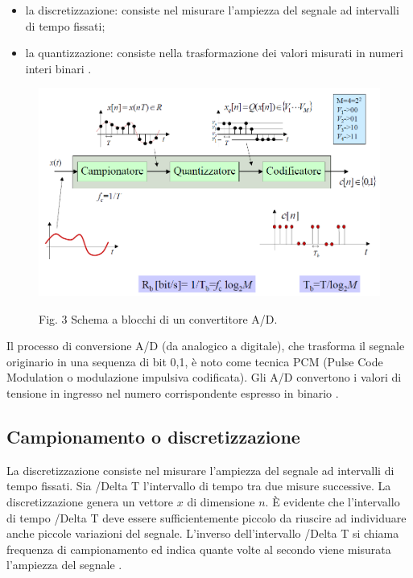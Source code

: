 \documentclass[a4paper]{report} %
\begin{document}
\begin{itemize}
\item la discretizzazione: consiste nel misurare l'ampiezza del segnale ad intervalli di tempo fissati;
\item la quantizzazione: consiste nella trasformazione dei valori misurati in numeri interi binari \cite{art:rif.2}. 
\end{itemize} 

\begin{figure}
	\centering
	\includegraphics[scale=.4]{Immagini/schemaAD.png}
	
	Fig. 3 Schema a blocchi di un convertitore A/D.
\end{figure}

Il processo di conversione A/D (da analogico a digitale), che trasforma il segnale originario in una sequenza di bit {0,1}, è noto come tecnica PCM (Pulse Code Modulation o modulazione impulsiva codificata). Gli A/D convertono i valori di tensione in ingresso nel numero corrispondente espresso in binario \cite{art:rif.7}. 
\subsection{Campionamento o discretizzazione}
La discretizzazione consiste nel misurare l'ampiezza del segnale ad intervalli di tempo fissati. Sia /Delta T l'intervallo di tempo tra due misure successive. La discretizzazione genera un vettore $x$ di dimensione $n$. È evidente che l'intervallo di tempo /Delta T deve essere sufficientemente piccolo da riuscire ad individuare anche piccole variazioni del segnale. L'inverso dell'intervallo /Delta T si chiama frequenza di campionamento ed indica quante volte al secondo viene misurata l'ampiezza del segnale \cite{art:rif.2}.  
\end{document}
